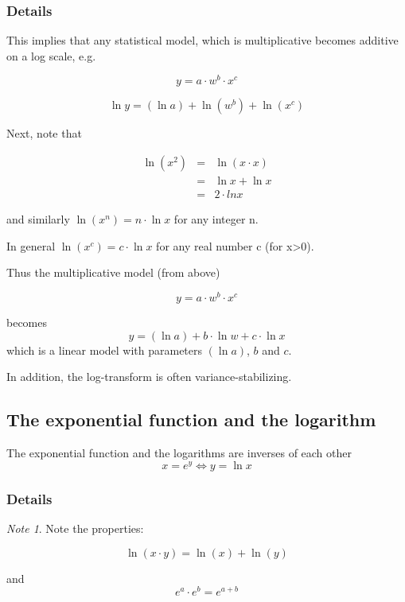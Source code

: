 \documentclass[12pt,a4paper]{article}
\theoremstyle{regla}
\theoremstyle{remark}
\newtheorem{notes}{Note}[section]
\theoremstyle{definition}
\theoremstyle{nonumberbreak}
\begin{document}
\subsubsection{Details}
This implies that any statistical model, which is multiplicative becomes additive on a log scale, e.g.

$$y = a \cdot w^b \cdot x^c$$

$$\ln y = (\ln a) + \ln (w^b) + \ln (x^c)$$

Next, note that

\begin{eqnarray*}
\ln (x^2)&=& \ln (x \cdot x)\\
&=& \ln x + \ln x\\
&=& 2 \cdot ln x
\end{eqnarray*} 

and similarly $\ln (x^n) = n \cdot \ln x$ for any integer n.

In general $\ln (x^c) = c \cdot \ln x$ for any real number c (for x>0).

Thus the multiplicative model (from above)

$$y=a \cdot w^b \cdot x^c$$

becomes
$$y= (\ln a) + b \cdot \ln w + c \cdot \ln x$$
which is a linear model with parameters $(\ln a)$, $b$ and $c$.

In addition, the log-transform is often variance-stabilizing. 

\subsection{The exponential function and the logarithm}
\begin{fbox}
\begin{minipage}{0.97\textwidth}
The exponential function and the logarithms are inverses of each other\\
$$x = e^y \Leftrightarrow y = \ln{x}$$
\end{minipage}
\end{fbox}
\subsubsection{Details}
\begin{notes}
Note the properties:

$$\ln (x \cdot y) = \ln (x) + \ln (y)$$

and
$$e^a \cdot e^b = e^{a+b}$$
\end{notes}
\end{document}

